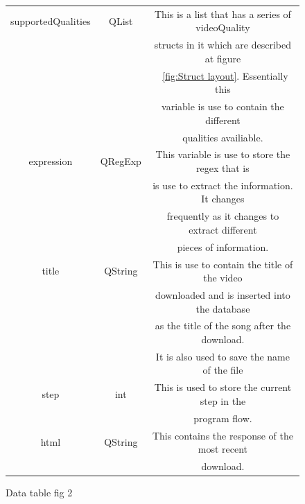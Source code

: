 \documentclass{article}
\begin{document}
\begin{figure}[h]
\begin{center}
\begin{tabular} { | c | c | c |}
            supportedQualities&   QList      &This is a list that has a series of videoQuality\\
                                             &&structs in it which are described at figure    \\
                                             &&~\ref{fig:Struct layout}. Essentially this     \\
                                             &&variable is use to contain the different       \\
                                             &&qualities availiable.                          \\ \hline
            expression         &  QRegExp    &This variable is use to store the regex that is \\
                                             && is use to extract the information. It changes \\
                                             && frequently as it changes to extract different \\
                                             &&pieces of information.                         \\ \hline
            title              &  QString    &This is use to contain the title of the video   \\
                                             && downloaded and is inserted into the database  \\
                                             &&as the title of the song after the download.   \\
                                             &&It is also used to save the name of the file   \\ \hline
            step                &   int      &This is used to store the current step in the   \\
                                             &&program flow.                                  \\ \hline
            html                &  QString   &This contains the response of the most recent   \\
                                             &&download.                                      \\ \hline

        \end{tabular}
    \end{center}
    \caption{Data table fig 2} \label{fig:dataTable2}
\end{figure}
\end{document}
